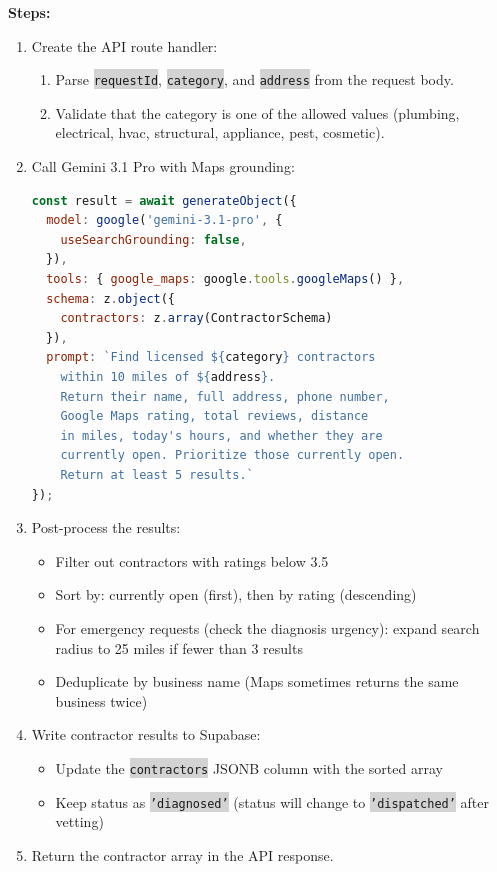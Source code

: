 \documentclass[11pt, a4paper]{article}
\newcommand{\code}[1]{\texttt{\small\colorbox{lightgray}{#1}}}
\begin{document}
\textbf{Steps:}
\begin{enumerate}[leftmargin=2em, itemsep=2pt]
  \item Create the API route handler:
    \begin{enumerate}[itemsep=1pt]
      \item Parse \code{requestId}, \code{category}, and \code{address} from the request body.
      \item Validate that the category is one of the allowed values (plumbing, electrical, hvac, structural, appliance, pest, cosmetic).
    \end{enumerate}

  \item Call Gemini 3.1 Pro with Maps grounding:
\begin{lstlisting}[language=JavaScript]
const result = await generateObject({
  model: google('gemini-3.1-pro', {
    useSearchGrounding: false,
  }),
  tools: { google_maps: google.tools.googleMaps() },
  schema: z.object({
    contractors: z.array(ContractorSchema)
  }),
  prompt: `Find licensed ${category} contractors 
    within 10 miles of ${address}. 
    Return their name, full address, phone number,
    Google Maps rating, total reviews, distance 
    in miles, today's hours, and whether they are 
    currently open. Prioritize those currently open.
    Return at least 5 results.`
});
\end{lstlisting}

  \item Post-process the results:
    \begin{itemize}[itemsep=1pt]
      \item Filter out contractors with ratings below 3.5
      \item Sort by: currently open (first), then by rating (descending)
      \item For emergency requests (check the diagnosis urgency): expand search radius to 25 miles if fewer than 3 results
      \item Deduplicate by business name (Maps sometimes returns the same business twice)
    \end{itemize}

  \item Write contractor results to Supabase:
    \begin{itemize}[itemsep=1pt]
      \item Update the \code{contractors} JSONB column with the sorted array
      \item Keep status as \code{'diagnosed'} (status will change to \code{'dispatched'} after vetting)
    \end{itemize}

  \item Return the contractor array in the API response.
\end{enumerate}
\end{document}
